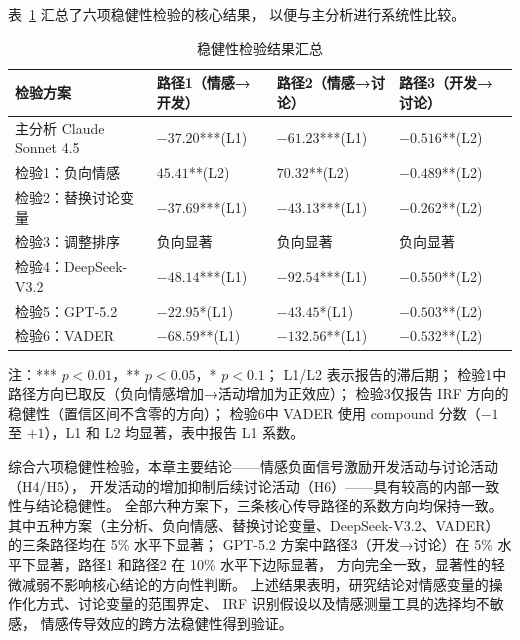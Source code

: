 \documentclass[
    type = master, %
    degree = professional,        %
    decl-page,  %
    twoside,                %
    fontset = fandol %
  ]{njuthesis}
\begin{document}
表~\ref{tab:robustness} 汇总了六项稳健性检验的核心结果，
以便与主分析进行系统性比较。

\begin{table}[htbp]
    \centering
    \caption{稳健性检验结果汇总}
    \label{tab:robustness}
    \small
    \begin{tabularx}{\textwidth}{p{3.6cm}XXX}
        \toprule
        检验方案 & 路径1（情感→开发） & 路径2（情感→讨论） & 路径3（开发→讨论） \\
        \midrule
        主分析 Claude Sonnet 4.5 &
            $-37.20$***(L1) &
            $-61.23$***(L1) &
            $-0.516$**(L2) \\[3pt]
        检验1：负向情感 &
            $45.41$**(L2) &
            $70.32$**(L2) &
            $-0.489$**(L2) \\[3pt]
        检验2：替换讨论变量 &
            $-37.69$***(L1) &
            $-43.13$***(L1) &
            $-0.262$**(L2) \\[3pt]
        检验3：调整排序 &
            负向显著 &
            负向显著 &
            负向显著 \\[3pt]
        检验4：DeepSeek-V3.2 &
            $-48.14$***(L1) &
            $-92.54$***(L1) &
            $-0.550$**(L2) \\[3pt]
        检验5：GPT-5.2 &
            $-22.95$*(L1) &
            $-43.45$*(L1) &
            $-0.503$**(L2) \\[3pt]
        检验6：VADER &
            $-68.59$**(L1) &
            $-132.56$**(L1) &
            $-0.532$**(L2) \\
        \bottomrule
    \end{tabularx}
    \begin{minipage}{\textwidth}
        \vspace{0.3em}
        \footnotesize 注：*** $p<0.01$，** $p<0.05$，* $p<0.1$；
        L1/L2 表示报告的滞后期；
        检验1中路径方向已取反（负向情感增加→活动增加为正效应）；
        检验3仅报告 IRF 方向的稳健性（置信区间不含零的方向）；
        检验6中 VADER 使用 compound 分数（$-1$ 至 $+1$），L1 和 L2 均显著，表中报告 L1 系数。
    \end{minipage}
\end{table}

综合六项稳健性检验，本章主要结论——情感负面信号激励开发活动与讨论活动（H4/H5），
开发活动的增加抑制后续讨论活动（H6）——具有较高的内部一致性与结论稳健性。
全部六种方案下，三条核心传导路径的系数方向均保持一致。
其中五种方案（主分析、负向情感、替换讨论变量、DeepSeek-V3.2、VADER）的三条路径均在 5\% 水平下显著；
GPT-5.2 方案中路径3（开发→讨论）在 5\% 水平下显著，路径1 和路径2 在 10\% 水平下边际显著，
方向完全一致，显著性的轻微减弱不影响核心结论的方向性判断。
上述结果表明，研究结论对情感变量的操作化方式、讨论变量的范围界定、
IRF 识别假设以及情感测量工具的选择均不敏感，
情感传导效应的跨方法稳健性得到验证。
\end{document}
